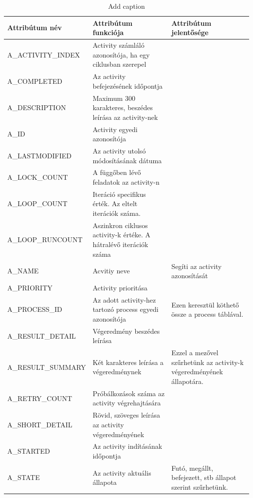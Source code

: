 \begin{table}[htbp] \label{tab:properties}
	\centering
	\caption{Add caption}
	\begin{tabular}{lp{8cm}p{4cm}}
		Attribútum név & Attribútum funkciója & Attribútum jelentősége \\
		\midrule
		A\_ACTIVITY\_INDEX & Activity számláló azonosítója, ha egy ciklusban szerepel &  \\
		A\_COMPLETED & Az activity befejezésének időpontja &  \\
		A\_DESCRIPTION & Maximum 300 karakteres, beszédes leírása az activity-nek &  \\
		A\_ID & Activity egyedi azonosítója &  \\
		A\_LASTMODIFIED & Az activity utolsó módosításának dátuma &  \\
		A\_LOCK\_COUNT & A függőben lévő feladatok az activity-n &  \\
		A\_LOOP\_COUNT & Iteráció specifikus érték. Az eltelt iterációk száma. &  \\
		A\_LOOP\_RUNCOUNT & Aszinkron ciklusos activity-k értéke. A hátralévő iterációk száma &  \\
		A\_NAME & Acvitiy neve & Segíti az activity azonosítását \\
		A\_PRIORITY & Activity prioritása &  \\
		A\_PROCESS\_ID & Az adott activity-hez tartozó process egyedi azonosítója & Ezen keresztül köthető össze a process táblával. \\
		A\_RESULT\_DETAIL & Végeredmény beszédes leírása &  \\
		A\_RESULT\_SUMMARY & Két karakteres leírása a végeredménynek & Ezzel a mezővel szűrhetünk az activity-k végeredményének állapotára. \\
		A\_RETRY\_COUNT & Próbálkozások száma az activity végrehajtására &  \\
		A\_SHORT\_DETAIL & Rövid, szöveges leírása az activity végeredményének &  \\
		A\_STARTED & Az activity indításának időpontja &  \\
		A\_STATE & Az activity aktuális állapota & Futó, megállt, befejezett, stb állapot szerint szűrhetünk. \\
	\end{tabular}%
	\label{tab:addlabel}%
\end{table}%


